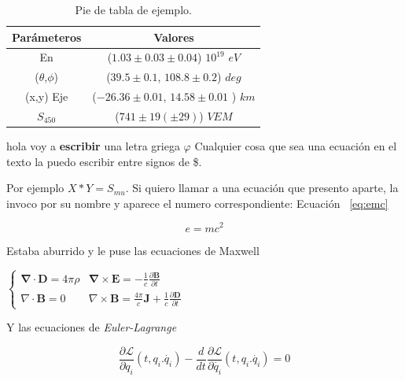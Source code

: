 \documentclass[twoside]{article}
\providecommand{\dpart}[2]{\frac{\partial#1}{\partial#2}}
\providecommand{\mv}[1]{\mathbf{#1}}
\providecommand{\dive}[1]{\nabla \cdot\mathbf{#1}}
\providecommand{\rot}[1]{\nabla \times\mathbf{#1}}
\newcommand\grad{\mathbf{\nabla}}
\begin{document}
\begin{multicols}{2}
\begin{table}[H]
\centering
\begin{tabular}[c]{|cc|}%
    \hline %
    Parámeteros           & Valores \\
    \hline
    En                  & ($1.03 \pm 0.03 \pm 0.04$) $10^{19}$ $eV$      \\
    ($\theta$,$\phi$)   & ($39.5 \pm 0.1$, $108.8 \pm 0.2$) $deg$      \\
    (x,y) Eje           & ($-26.36 \pm 0.01$, $14.58 \pm 0.01$ ) $km$     \\%
    $S_{450}$           & ($741 \pm 19 (\pm 29)$) $VEM$       \\
    \hline
  \end{tabular}
  \caption{\footnotesize {Pie de tabla de ejemplo.}}
  \label{tab:ejemplo}%
\end{table}

hola voy a\textbf{ escribir} una letra griega $\varphi$ 
Cualquier cosa que sea una ecuación en el texto la puedo escribir entre signos de \$.

Por ejemplo $X * Y = S_{mu}$. Si quiero llamar a una ecuación que presento aparte, la invoco por su nombre y aparece el numero correspondiente: Ecuación ~\ref{eq:emc}

\begin{equation}
\label{eq:emc}
e = mc^2
\end{equation}

Estaba aburrido y le puse las ecuaciones de Maxwell

\begin{center}
$
\left\{
\begin{array}{cc}
\grad\cdot \mv{D} = 4\pi \rho  & \grad\times\mv{E}=-\frac{1}{c}\dpart{\mv{B}}{t} \\ 
\dive{B}=0 &\rot{B}=\frac{4\pi}{c}\mv{J}+\frac{1}{c}\dpart{\mv{D}}{t} \
\end{array} 
\right.
$
\end{center}

Y las ecuaciones de \textit{Euler-Lagrange} 

$$\dpart{\mathscr{L}}{q_i}(t,q_i.\dot{q_i})-\frac{d}{dt}\dpart{\mathscr{L}}{\dot{q_i}}(t,q_i.\dot{q_i})=0 $$


\end{multicols}
\end{document}
